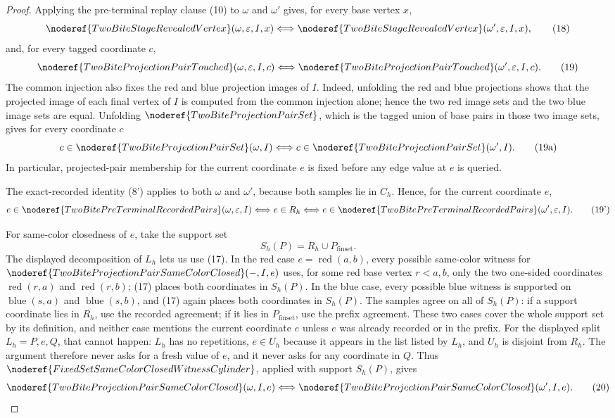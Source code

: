 \begin{proof}
Applying the pre-terminal replay clause (10) to \(\omega\) and \(\omega'\) gives, for
every base vertex \(x\),
\[
\noderef{TwoBiteStageRevealedVertex}(\omega,\varepsilon,I,x)
\Longleftrightarrow
\noderef{TwoBiteStageRevealedVertex}(\omega',\varepsilon,I,x),
\tag{18}
\]
and, for every tagged coordinate \(c\),
\[
\noderef{TwoBiteProjectionPairTouched}(\omega,\varepsilon,I,c)
\Longleftrightarrow
\noderef{TwoBiteProjectionPairTouched}(\omega',\varepsilon,I,c).
\tag{19}
\]
The common injection also fixes the red and blue projection images of \(I\).
Indeed, unfolding the red and blue projections shows that the projected image
of each final vertex of \(I\) is computed from the common injection alone;
hence the two red image sets and the two blue image sets are equal.  Unfolding
\(\noderef{TwoBiteProjectionPairSet}\), which is the tagged union of base
pairs in those two image sets, gives for every coordinate \(c\)
\[
c\in\noderef{TwoBiteProjectionPairSet}(\omega,I)
\Longleftrightarrow
c\in\noderef{TwoBiteProjectionPairSet}(\omega',I).
\tag{19a}
\]
In particular, projected-pair membership for the current coordinate \(e\) is
fixed before any edge value at \(e\) is queried.

The exact-recorded identity (8') applies to both \(\omega\) and \(\omega'\),
because both samples lie in \(C_h\).  Hence, for the current coordinate \(e\),
\[
e\in\noderef{TwoBitePreTerminalRecordedPairs}(\omega,\varepsilon,I)
\Longleftrightarrow e\in R_h
\Longleftrightarrow
e\in\noderef{TwoBitePreTerminalRecordedPairs}(\omega',\varepsilon,I).
\tag{19'}
\]

For same-color closedness of \(e\), take the support set
\[
S_h(P)=R_h\cup P_{\mathrm{finset}}.
\]
The displayed decomposition of \(L_h\) lets us use (17).  In the red case
\(e=\operatorname{red}(a,b)\), every possible same-color witness for
\(\noderef{TwoBiteProjectionPairSameColorClosed}(-,I,e)\) uses, for some red
base vertex \(r<a,b\), only the two one-sided coordinates
\(\operatorname{red}(r,a)\) and \(\operatorname{red}(r,b)\); (17) places both
coordinates in \(S_h(P)\).  In the blue case, every possible blue witness is
supported on \(\operatorname{blue}(s,a)\) and \(\operatorname{blue}(s,b)\),
and (17) again places both coordinates in \(S_h(P)\).  The samples agree on
all of \(S_h(P)\): if a support coordinate lies in \(R_h\), use the recorded
agreement; if it lies in \(P_{\mathrm{finset}}\), use the prefix agreement.
These two cases cover the whole support set by its definition, and neither
case mentions the current coordinate \(e\) unless \(e\) was already recorded
or in the prefix.  For the displayed split \(L_h=P,e,Q\), that cannot happen:
\(L_h\) has no repetitions, \(e\in U_h\) because it appears in the list
listed by \(L_h\), and \(U_h\) is disjoint from \(R_h\).  The argument
therefore never asks for a fresh value of \(e\), and it never asks for any
coordinate in \(Q\).
Thus \(\noderef{FixedSetSameColorClosedWitnessCylinder}\), applied with
support \(S_h(P)\), gives
\[
\noderef{TwoBiteProjectionPairSameColorClosed}(\omega,I,e)
\Longleftrightarrow
\noderef{TwoBiteProjectionPairSameColorClosed}(\omega',I,e).
\tag{20}
\]


\end{proof}
